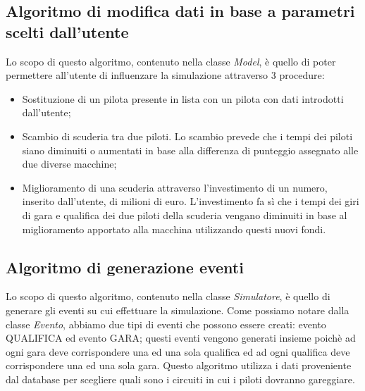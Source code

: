 \subsection{Algoritmo di modifica dati in base a parametri scelti dall'utente}
Lo scopo di questo algoritmo, contenuto nella classe \textit{Model}, è quello di poter permettere all'utente di influenzare la simulazione attraverso 3 procedure: 
\begin{itemize}
\item Sostituzione di un pilota presente in lista con un pilota con dati introdotti dall'utente;
\item Scambio di scuderia tra due piloti. Lo scambio prevede che i tempi dei piloti siano diminuiti o aumentati in base alla differenza di punteggio assegnato alle due diverse macchine;
\item Miglioramento di una scuderia attraverso l'investimento di un numero, inserito dall'utente, di milioni di euro. L'investimento fa sì che i tempi dei giri di gara e qualifica dei due piloti della scuderia vengano diminuiti in base al miglioramento apportato alla macchina utilizzando questi nuovi fondi.
\end{itemize}
\subsection{Algoritmo di generazione eventi}
Lo scopo di questo algoritmo, contenuto nella classe \textit{Simulatore}, è quello di generare gli eventi su cui effettuare la simulazione. Come possiamo notare dalla classe \textit{Evento}, abbiamo due tipi di eventi che possono essere creati: evento QUALIFICA ed evento GARA; questi eventi vengono generati insieme poichè ad ogni gara deve corrispondere una ed una sola qualifica ed ad ogni qualifica deve corrispondere una ed una sola gara. Questo algoritmo utilizza i dati proveniente dal database per scegliere quali sono i circuiti in cui i piloti dovranno gareggiare.
